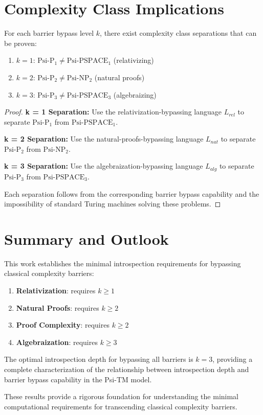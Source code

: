 \section{Complexity Class Implications}

\begin{theorem}
For each barrier bypass level $k$, there exist complexity class separations that can be proven:
\begin{enumerate}
\item $k = 1$: $\text{Psi-P}_1 \neq \text{Psi-PSPACE}_1$ (relativizing)
\item $k = 2$: $\text{Psi-P}_2 \neq \text{Psi-NP}_2$ (natural proofs)
\item $k = 3$: $\text{Psi-P}_3 \neq \text{Psi-PSPACE}_3$ (algebraizing)
\end{enumerate}
\end{theorem}

\begin{proof}
\textbf{k = 1 Separation:}
Use the relativization-bypassing language $L_{rel}$ to separate $\text{Psi-P}_1$ from $\text{Psi-PSPACE}_1$.

\textbf{k = 2 Separation:}
Use the natural-proofs-bypassing language $L_{nat}$ to separate $\text{Psi-P}_2$ from $\text{Psi-NP}_2$.

\textbf{k = 3 Separation:}
Use the algebraization-bypassing language $L_{alg}$ to separate $\text{Psi-P}_3$ from $\text{Psi-PSPACE}_3$.

Each separation follows from the corresponding barrier bypass capability and the impossibility of standard Turing machines solving these problems.
\end{proof}

\section{Summary and Outlook}

This work establishes the minimal introspection requirements for bypassing classical complexity barriers:

\begin{enumerate}
\item \textbf{Relativization}: requires $k \geq 1$
\item \textbf{Natural Proofs}: requires $k \geq 2$
\item \textbf{Proof Complexity}: requires $k \geq 2$
\item \textbf{Algebraization}: requires $k \geq 3$
\end{enumerate}

The optimal introspection depth for bypassing all barriers is $k = 3$, providing a complete characterization of the relationship between introspection depth and barrier bypass capability in the Psi-TM model.

These results provide a rigorous foundation for understanding the minimal computational requirements for transcending classical complexity barriers.

